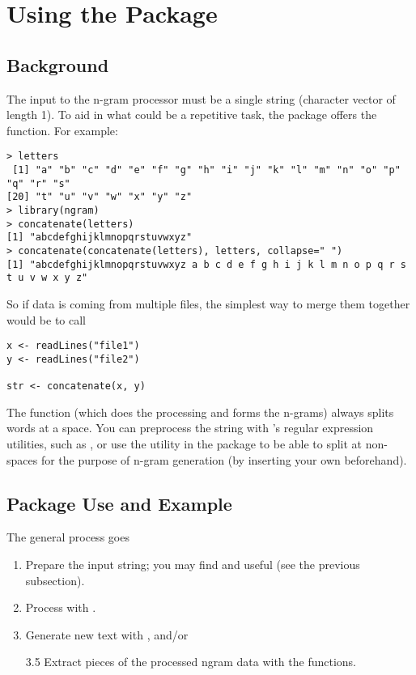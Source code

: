 \section{Using the Package}


\subsection{Background}

The input to the n-gram processor must be a single string (character vector of length 
1).  To aid in what could be a repetitive task, the package offers 
the  function.  For example:

\begin{lstlisting}[language=inteRactive]
> letters
 [1] "a" "b" "c" "d" "e" "f" "g" "h" "i" "j" "k" "l" "m" "n" "o" "p" "q" "r" "s"
[20] "t" "u" "v" "w" "x" "y" "z"
> library(ngram)
> concatenate(letters)
[1] "abcdefghijklmnopqrstuvwxyz"
> concatenate(concatenate(letters), letters, collapse=" ")
[1] "abcdefghijklmnopqrstuvwxyz a b c d e f g h i j k l m n o p q r s t u v w x y z"
\end{lstlisting}

So if data is coming from multiple files, the simplest way to merge them 
together would be to call

\begin{lstlisting}[language=rr]
x <- readLines("file1")
y <- readLines("file2")

str <- concatenate(x, y)
\end{lstlisting}

The  function (which does the processing and forms the n-grams) always splits words 
at a 
space. You can preprocess the string with \R's regular expression 
utilities, such as , or use the  utility in 
the \thispackage package to be able to split at non-spaces for the purpose of n-gram generation (by 
inserting your own beforehand).



\subsection{Package Use and Example}

The general process goes
\begin{enumerate}
  \item Prepare the input string; you may find  and 
 useful (see the previous subsection).
  \item Process with .
  \item Generate new text with , and/or
  \item[3.5] Extract pieces of the processed ngram data with the  
functions.
\end{enumerate}



